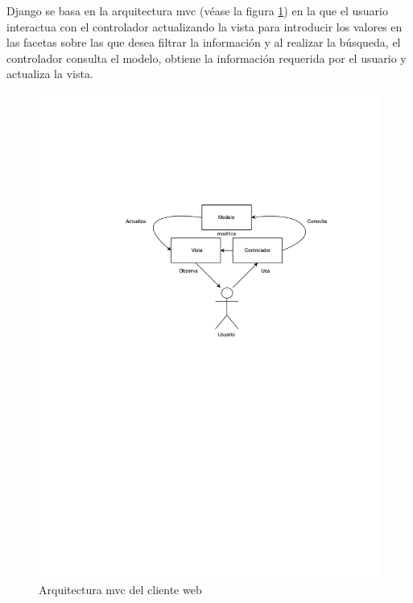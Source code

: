 Django se basa en la arquitectura \acrshort{mvc} (véase la figura \ref{fig:mvc}) en la que el usuario interactua con el controlador actualizando la vista para introducir los valores en las facetas sobre las que desea filtrar la información y al realizar la búsqueda, el controlador consulta el modelo, obtiene la información requerida por el usuario y actualiza la vista.

\begin{figure}[!htbp]
	\centering
	\includegraphics[scale=0.6]{fig/mvc}
	\caption{Arquitectura \acrshort{mvc} del cliente web}
	\label{fig:mvc}
\end{figure}

